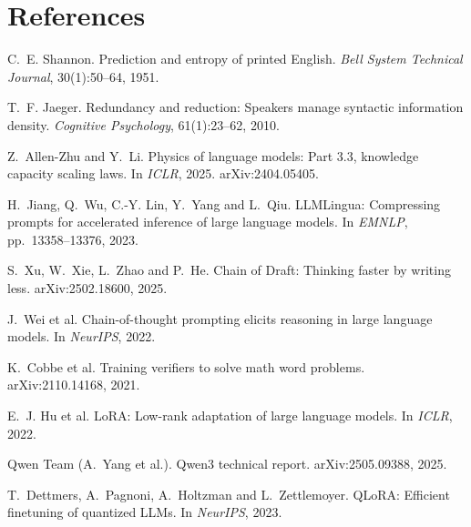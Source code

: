\documentclass[10pt,a4paper,twocolumn]{article}
\begin{document}
\balance
{\small
\section*{References}
\begin{enumerate}[label={[\arabic*]},leftmargin=1.6em]
\item C.~E. Shannon. Prediction and entropy of printed English. \emph{Bell System Technical Journal}, 30(1):50--64, 1951.
\item T.~F. Jaeger. Redundancy and reduction: Speakers manage syntactic information density. \emph{Cognitive Psychology}, 61(1):23--62, 2010.
\item Z.~Allen-Zhu and Y.~Li. Physics of language models: Part 3.3, knowledge capacity scaling laws. In \emph{ICLR}, 2025. arXiv:2404.05405.
\item H.~Jiang, Q.~Wu, C.-Y. Lin, Y.~Yang and L.~Qiu. LLMLingua: Compressing prompts for accelerated inference of large language models. In \emph{EMNLP}, pp.~13358--13376, 2023.
\item S.~Xu, W.~Xie, L.~Zhao and P.~He. Chain of Draft: Thinking faster by writing less. arXiv:2502.18600, 2025.
\item J.~Wei et al. Chain-of-thought prompting elicits reasoning in large language models. In \emph{NeurIPS}, 2022.
\item K.~Cobbe et al. Training verifiers to solve math word problems. arXiv:2110.14168, 2021.
\item E.~J. Hu et al. LoRA: Low-rank adaptation of large language models. In \emph{ICLR}, 2022.
\item Qwen Team (A.~Yang et al.). Qwen3 technical report. arXiv:2505.09388, 2025.
\item T.~Dettmers, A.~Pagnoni, A.~Holtzman and L.~Zettlemoyer. QLoRA: Efficient finetuning of quantized LLMs. In \emph{NeurIPS}, 2023.
\end{enumerate}
}
\end{document}
